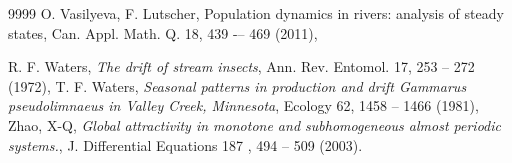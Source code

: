 \begin{thebibliography}{9999}
		O. Vasilyeva, F. Lutscher, Population dynamics in rivers: analysis of steady states, Can. Appl. Math. Q. 18,
		439 -– 469 (2011),
		
		R. F. Waters,
		\emph{The drift of stream insects},
		Ann. Rev. Entomol. 17,  253 -- 272 (1972),
		T. F. Waters,
		\emph{Seasonal patterns in production and drift Gammarus pseudolimnaeus in Valley Creek, Minnesota},
		Ecology 62,  1458 -- 1466 (1981),
		Zhao, X-Q, 
		\emph{Global attractivity in monotone and subhomogeneous almost periodic systems.},
		J. Differential Equations 187 , 494 -- 509 (2003).
	\end{thebibliography}
	